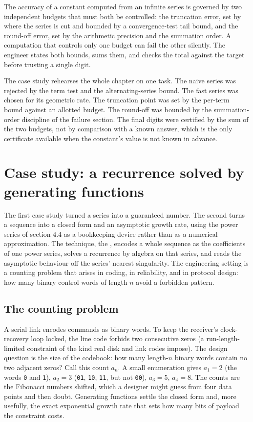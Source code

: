 \begin{principle}
The accuracy of a constant computed from an infinite series is governed
by two independent budgets that must both be controlled: the truncation
error, set by where the series is cut and bounded by a convergence-test
tail bound, and the round-off error, set by the arithmetic precision and
the summation order. A computation that controls only one budget can fail
the other silently. The engineer states both bounds, sums them, and
checks the total against the target before trusting a single digit.
\end{principle}

The case study rehearses the whole chapter on one task. The naive series
was rejected by the term test and the alternating-series bound. The fast
series was chosen for its geometric rate. The truncation point was set by
the per-term bound against an allotted budget. The round-off was bounded
by the summation-order discipline of the failure section. The final
digits were certified by the sum of the two budgets, not by comparison
with a known answer, which is the only certificate available when the
constant's value is not known in advance.

\section{Case study: a recurrence solved by generating functions}

The first case study turned a series into a guaranteed number. The
second turns a sequence into a closed form and an asymptotic growth rate,
using the power series of section 4.4 as a bookkeeping device rather than
as a numerical approximation. The technique, the , encodes a whole sequence as the coefficients of one power
series, solves a recurrence by algebra on that series, and reads the
asymptotic behaviour off the series' nearest singularity. The engineering
setting is a counting problem that arises in coding, in reliability, and
in protocol design: how many binary control words of length $n$ avoid a
forbidden pattern.

\subsection{The counting problem}

A serial link encodes commands as binary words. To keep the receiver's
clock-recovery loop locked, the line code forbids two consecutive zeros
(a run-length-limited constraint of the kind real disk and link codes
impose). The design question is the size of the codebook: how many
length-$n$ binary words contain no two adjacent zeros? Call this count
$a_{n}$. A small enumeration gives $a_{1} = 2$ (the words \texttt{0} and
\texttt{1}), $a_{2} = 3$ (\texttt{01}, \texttt{10}, \texttt{11}, but not
\texttt{00}), $a_{3} = 5$, $a_{4} = 8$. The counts are the Fibonacci
numbers shifted, which a designer might guess from four data points and
then doubt. Generating functions settle the closed form and, more
usefully, the exact exponential growth rate that sets how many bits of
payload the constraint costs.

